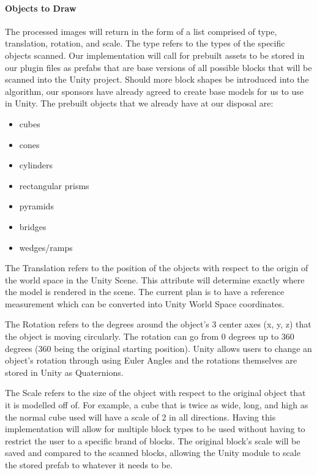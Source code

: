 \documentclass[12pt]{article}
\providecommand{\tightlist}{%
  \setlength{\itemsep}{0pt}\setlength{\parskip}{0pt}}
\begin{document}
\paragraph{Objects to Draw}\label{objects-to-draw}

The processed images will return in the form of a list comprised of
type, translation, rotation, and scale. The type refers to the types of
the specific objects scanned. Our implementation will call for prebuilt
assets to be stored in our plugin files as prefabs that are base
versions of all possible blocks that will be scanned into the Unity
project. Should more block shapes be introduced into the algorithm, our
sponsors have already agreed to create base models for us to use in
Unity. The prebuilt objects that we already have at our disposal are:

\begin{itemize}
\tightlist
\item
  cubes
\item
  cones
\item
  cylinders
\item
  rectangular prisms
\item
  pyramids
\item
  bridges
\item
  wedges/ramps
\end{itemize}

The Translation refers to the position of the objects with respect to
the origin of the world space in the Unity Scene. This attribute will
determine exactly where the model is rendered in the scene. The current
plan is to have a reference measurement which can be converted into
Unity World Space coordinates.

The Rotation refers to the degrees around the object's 3 center axes (x,
y, z) that the object is moving circularly. The rotation can go from 0
degrees up to 360 degrees (360 being the original starting position).
Unity allows users to change an object's rotation through using Euler
Angles and the rotations themselves are stored in Unity as Quaternions.

The Scale refers to the size of the object with respect to the original
object that it is modelled off of. For example, a cube that is twice as
wide, long, and high as the normal cube used will have a scale of 2 in
all directions. Having this implementation will allow for multiple block
types to be used without having to restrict the user to a specific brand
of blocks. The original block's scale will be saved and compared to the
scanned blocks, allowing the Unity module to scale the stored prefab to
whatever it needs to be.
\end{document}
